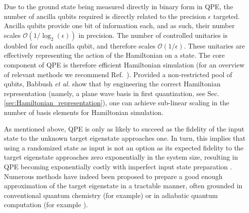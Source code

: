 Due to the ground state being measured directly in binary form in QPE, the number of ancilla qubits required is directly related to the precision $\epsilon$ targeted. Ancilla qubits provide one bit of information each, and as such, their number scales $\mathcal{O}(1/\log_2(\epsilon))$ in precision. The number of controlled unitaries is doubled for each ancilla qubit, and therefore scales $\mathcal{O}(1/\epsilon)$. These unitaries are effectively representing the action of the Hamiltonian on a state. The core component of QPE is therefore efficient Hamiltonian simulation (for an overview of relevant methods we recommend Ref.~\cite{Childs2018, Cao2019_QC}). Provided a non-restricted pool of qubits, Babbush \textit{et al.} \cite{Babbush2018} show that by engineering the correct Hamiltonian representation (namely, a plane wave basis in first quantization, see Sec. \ref{sec:Hamiltonian_representation}), one can achieve sub-linear scaling in the number of basis elements for Hamiltonian simulation.  

As mentioned above, QPE is only as likely to succeed as the fidelity of the input state to the unknown target eigenstate approaches one. In turn, this implies that using a randomized state as input is not an option as its expected fidelity to the target eigenstate approaches zero exponentially in the system size, resulting in QPE becoming exponentially costly with imperfect input state preparation \cite{McClean2014}. Numerous methods have indeed been proposed to prepare a good enough approximation of the target eigenstate in a tractable manner, often grounded in conventional quantum chemistry (for example\cite{tubman2018postponing, Sugisaki2018, Sugisaki2019, Motta2019, Murta2021}) or in adiabatic quantum computation (for example \cite{AspuruGuzik2005, Albash2018, Matsuura2020}). 

